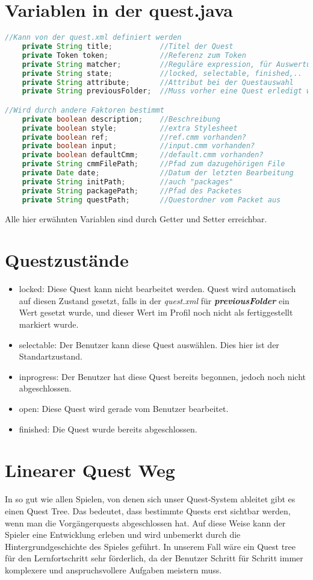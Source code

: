 \section{Variablen in der quest.java}
\begin{lstlisting}[language=JAVA]
//Kann von der quest.xml definiert werden
	private String title;			//Titel der Quest		
	private Token token;			//Referenz zum Token
	private String matcher;			//Reguläre expression, für Auswertung benötigt
	private String state;			//locked, selectable, finished,..
	private String attribute;		//Attribut bei der Questauswahl
	private String previousFolder;	//Muss vorher eine Quest erledigt werden

//Wird durch andere Faktoren bestimmt
	private boolean description;	//Beschreibung
	private boolean style;			//extra Stylesheet
	private boolean ref;			//ref.cmm vorhanden?
	private boolean input;			//input.cmm vorhanden?	
	private boolean defaultCmm;		//default.cmm vorhanden?
	private String cmmFilePath;		//Pfad zum dazugehörigen File	
	private Date date;				//Datum der letzten Bearbeitung
	private String initPath;		//auch "packages"
	private String packagePath;		//Pfad des Packetes
	private String questPath;		//Questordner vom Packet aus

\end{lstlisting}
Alle hier erwähnten Variablen sind durch Getter und Setter erreichbar.


\section{Questzustände}
\begin{itemize}
\item locked: Diese Quest kann nicht bearbeitet werden. Quest wird automatisch auf diesen Zustand gesetzt, falls in der \textit{quest.xml} für \textit{\textbf{previousFolder}} ein Wert gesetzt wurde, und dieser Wert im Profil noch nicht als fertiggestellt markiert wurde.
\item selectable: Der Benutzer kann diese Quest auswählen. Dies hier ist der Standartzustand.
\item inprogress: Der Benutzer hat diese Quest bereits begonnen, jedoch noch nicht abgeschlossen.
\item open: Diese Quest wird gerade vom Benutzer bearbeitet.
\item finished: Die Quest wurde bereits abgeschlossen.
\end{itemize}

\section{Linearer Quest Weg}
In so gut wie allen Spielen, von denen sich unser Quest-System ableitet gibt es einen Quest Tree.
Das bedeutet, dass bestimmte Quests erst sichtbar werden, wenn man die Vorgängerquests
abgeschlossen hat. Auf diese Weise kann der Spieler eine Entwicklung erleben und wird unbemerkt
durch die Hintergrundgeschichte des Spieles geführt. In unserem Fall wäre ein Quest tree für den
Lernfortschritt sehr förderlich, da der Benutzer Schritt für Schritt immer komplexere und
anspruchsvollere Aufgaben meistern muss.

